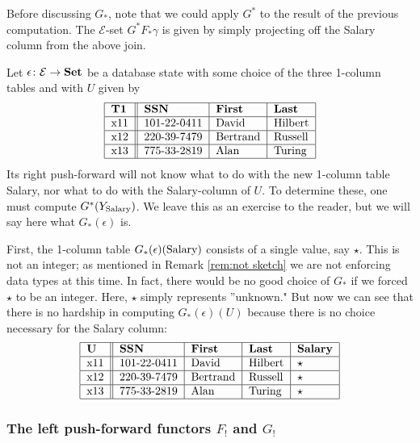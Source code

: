 \documentclass{amsart}
\def\tn{\textnormal}
\def\mc{\mathcal}
\def\to{\rightarrow}
\def\taking{\colon}
\def\Set{{\bf Set}}
\def\mcE{\mc{E}}
\theoremstyle{remark}
\theoremstyle{definition}
\begin{document}
Before discussing $G_*$, note that we could apply $G^*$ to the result of the previous computation.  The $\mcE$-set $G^*F_*\gamma$ is given by simply projecting off the Salary column from the above join.

Let $\epsilon\taking\mcE\to\Set$ be a database state with some choice of the three 1-column tables and with $U$ given by \begin{align*}\begin{tabular}{| l || l | l | l |}\hline {\bf T1}&{\bf SSN}&{\bf First}&{\bf Last}\\\hline x11&101-22-0411&David&Hilbert\\\hline x12&220-39-7479&Bertrand&Russell\\\hline x13&775-33-2819&Alan&Turing\\\hline\end{tabular}\end{align*}  Its right push-forward will not know what to do with the new 1-column table Salary, nor what to do with the Salary-column of $U$.  To determine these, one must compute $G^*(Y_{\tn{Salary}})$.  We leave this as an exercise to the reader, but we will say here what $G_*(\epsilon)$ is. 

First, the 1-column table $G_*(\epsilon)(\tn{Salary})$ consists of a single value, say $\star$.  This is not an integer; as mentioned in Remark \ref{rem:not sketch} we are not enforcing data types at this time.  In fact, there would be no good choice of $G_*$ if we forced $\star$ to be an integer.  Here, $\star$ simply represents ''unknown."  But now we can see that there is no hardship in computing $G_*(\epsilon)(U)$ because there is no choice necessary for the Salary column:   \begin{align*}\begin{tabular}{| l || l | l | l | l |}\hline {\bf U}&{\bf SSN}&{\bf First}&{\bf Last}&{\bf Salary}\\\hline x11&101-22-0411&David&Hilbert&$\star$\\\hline x12&220-39-7479&Bertrand&Russell&$\star$\\\hline x13&775-33-2819&Alan&Turing&$\star$\\\hline\end{tabular}\end{align*}

\subsubsection{The left push-forward functors $F_!$ and $G_!$}
\end{document}
